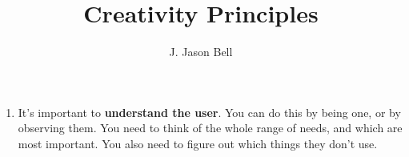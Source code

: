 \documentclass[11pt, oneside]{article}   	%
\title{Creativity Principles}
\author{J. Jason Bell}
\begin{document}
\maketitle
\begin{enumerate}
\item It's important to \textbf{understand the user}.  You can do this by being one, or by observing them.  You need to think of the whole range of needs, and which are most important.  You also need to figure out which things they don't use.  
\end{enumerate}
\end{document}
